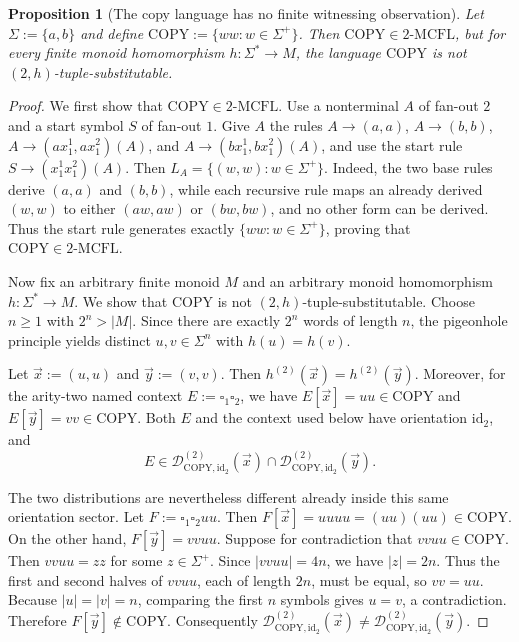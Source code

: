 \documentclass[11pt,a4paper]{article}
\numberwithin{equation}{section}
\theoremstyle{plain}
\newtheorem{proposition}[theorem]{Proposition}
\theoremstyle{definition}
\theoremstyle{remark}
\newcommand{\D}{\mathcal{D}}
\newcommand{\tuple}[1]{\vec{#1}}
\newcommand{\blank}{\square}
\begin{document}
\begin{proposition}[The copy language has no finite witnessing observation]
\label{prop:copy-infinite-observation}
Let \(\Sigma:=\{a,b\}\) and define
\(\mathrm{COPY}:=\{ww:w\in\Sigma^+\}\).
Then \(\mathrm{COPY}\in2\text{-}\mathrm{MCFL}\), but for every finite
monoid homomorphism \(h:\Sigma^*\to M\), the language \(\mathrm{COPY}\) is
not \((2,h)\)-tuple-substitutable.
\end{proposition}

\begin{proof}
We first show that \(\mathrm{COPY}\in2\text{-}\mathrm{MCFL}\).
Use a nonterminal \(A\) of fan-out \(2\) and a start symbol \(S\) of fan-out
\(1\).  Give \(A\) the rules
\(A\to(a,a)\), \(A\to(b,b)\),
\(A\to(a x_1^1,a x_1^2)(A)\), and
\(A\to(b x_1^1,b x_1^2)(A)\), and use the start rule
\(S\to(x_1^1x_1^2)(A)\).
Then \(L_A=\{(w,w):w\in\Sigma^+\}\).  Indeed, the two base rules derive
\((a,a)\) and \((b,b)\), while each recursive rule maps an already derived
\((w,w)\) to either \((aw,aw)\) or \((bw,bw)\), and no other form can be
derived.  Thus the start rule generates exactly
\(\{ww:w\in\Sigma^+\}\), proving that
\(\mathrm{COPY}\in2\text{-}\mathrm{MCFL}\).

Now fix an arbitrary finite monoid \(M\) and an arbitrary monoid homomorphism
\(h\colon\Sigma^*\to M\).  We show that \(\mathrm{COPY}\) is not
\((2,h)\)-tuple-substitutable.  Choose \(n\ge1\) with \(2^n>|M|\).
Since there are exactly \(2^n\) words of length \(n\), the pigeonhole
principle yields distinct \(u,v\in\Sigma^n\) with \(h(u)=h(v)\).

Let \(\tuple x:=(u,u)\) and \(\tuple y:=(v,v)\).  Then
\(h^{(2)}(\tuple x)=h^{(2)}(\tuple y)\).  Moreover, for the arity-two named
context \(E:=\blank_1\blank_2\), we have
\(E[\tuple x]=uu\in\mathrm{COPY}\) and
\(E[\tuple y]=vv\in\mathrm{COPY}\).  Both \(E\) and the context used below have orientation \(\mathrm{id}_2\), and
\[
E\in\D_{\mathrm{COPY},\mathrm{id}_2}^{(2)}(\tuple x)\cap
\D_{\mathrm{COPY},\mathrm{id}_2}^{(2)}(\tuple y).
\]

The two distributions are nevertheless different already inside this same
orientation sector.  Let \(F:=\blank_1\blank_2uu\).  Then
\(F[\tuple x]=uuuu=(uu)(uu)\in\mathrm{COPY}\).  On the other hand,
\(F[\tuple y]=vvuu\).  Suppose for contradiction that
\(vvuu\in\mathrm{COPY}\).  Then \(vvuu=zz\) for some \(z\in\Sigma^+\).
Since \(|vvuu|=4n\), we have \(|z|=2n\).  Thus the first and second halves
of \(vvuu\), each of length \(2n\), must be equal, so \(vv=uu\).
Because \(|u|=|v|=n\), comparing the first \(n\) symbols gives \(u=v\), a
contradiction.  Therefore \(F[\tuple y]\notin\mathrm{COPY}\).
Consequently
\(\D_{\mathrm{COPY},\mathrm{id}_2}^{(2)}(\tuple x)\neq
\D_{\mathrm{COPY},\mathrm{id}_2}^{(2)}(\tuple y)\).


\end{proof}
\end{document}
